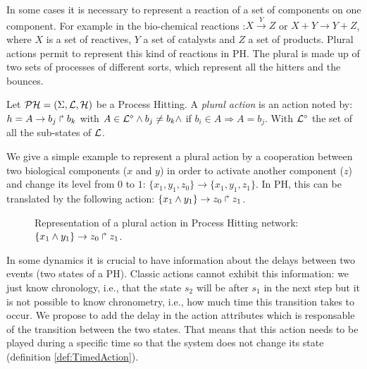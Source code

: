 In some cases it is necessary to represent a reaction of a set of components on one component. For example in the bio-chemical reactions :$X \xrightarrow{Y} Z$ or  $X + Y \rightarrow Y + Z$, where $ X $ is a set of reactives, $ Y $ a set of catalysts and $ Z $ a set of products. %
Plural actions permit to represent this kind of reactions in PH. The plural is made up of two sets of processes of different sorts, which represent all the hitters and the bounces.

\begin{definition}
\label{def:pluralAction}
\label{def:PhPluralAction}
Let $\mathcal{PH} = (\Sigma,\mathcal{L},\mathcal{H})$ be a Process Hitting.
A \emph{plural action} is an action noted by: $h=A\rightarrow b_j\Rsh b_k$ with $A \in \mathcal{L}^{\diamond} \wedge b_j\neq b_k \wedge$ if $b_i \in A \Rightarrow A=b_j$.
With $\mathcal{L}^{\diamond}$ the set of all the sub-states of $\mathcal{L}$.
\end{definition}

\begin{example}
We give a simple example to represent a plural action by a cooperation between two biological components ($x$ and $y$) in order to activate another component ($z$) and change its level from $0$ to $1$: $\{x_1, y_1, z_0 \} \rightarrow \{x_1, y_1, z_1 \} $. In PH, this can be translated by the following action: $\{x_1 \wedge y_1\}\rightarrow z_0\Rsh z_1 $.

\begin{figure}[ht]
\label{fig:ph-plurial} 
\centering
{}
\caption{
Representation of a plural action in Process Hitting network: $\{x_1 \wedge y_1\}\rightarrow z_0\Rsh z_1 $.
}

\end{figure}
\end{example}

In some dynamics it is crucial to have information about the delays between two events (two states of a PH). Classic actions cannot exhibit this information: we just know chronology, i.e., that the state $s_2$ will be after $s_1$ in the next step but it is not possible to know chronometry, i.e., how much time this transition takes to occur. We propose to add the delay in the action attributes which is responsable of the transition between the two states. That means that this action needs to be played during a specific time so that the system does not change its state (definition \ref{def:TimedAction}).

